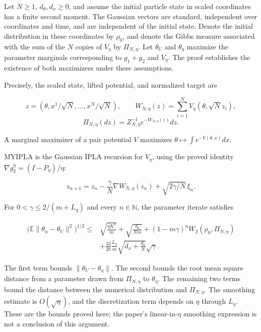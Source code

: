 \documentclass[11pt,a4paper]{report}
\begin{document}
Let \(N\ge1\), \(d_\theta,d_x\ge0\), and assume the initial particle state in scaled coordinates has a finite second moment. The Gaussian vectors are standard, independent over coordinates and time, and are independent of the initial state. Denote the initial distribution in these coordinates by \(\rho_0\), and denote the Gibbs measure associated with the sum of the \(N\) copies of \(V_\eta\) by \(\Pi_{N,\eta}\). Let \(\theta_U\) and \(\theta_\eta\) maximize the parameter marginals corresponding to \(g_1+g_2\) and \(V_\eta\). The proof establishes the existence of both maximizers under these assumptions.



Precisely, the scaled state, lifted potential, and normalized target are


\[z=(\theta,x^1/\sqrt N,\ldots,x^N/\sqrt N),\qquad
W_{N,\eta}(z)=\sum_{i=1}^N V_\eta(\theta,\sqrt N z_i),\]
\[\Pi_{N,\eta}(dz)=Z_{N,\eta}^{-1}e^{-W_{N,\eta}(z)}dz.\]


A marginal maximizer of a pair potential \(V\) maximizes \(\theta\mapsto\int e^{-V(\theta,x)}dx\).



MYIPLA is the Gaussian IPLA recursion for \(V_\eta\), using the proved identity \(\nabla g_2^\eta=(I-P_\eta)/\eta\):


\[z_{n+1}=z_n-\frac\gamma N\nabla W_{N,\eta}(z_n)+\sqrt{2\gamma/N}\,\xi_n.\]


For \(0<\gamma\le2/(m+L_\eta)\) and every \(n\in\mathbb N\), the parameter iterate satisfies


\[\begin{aligned}
\bigl(\mathbb E\|\theta_n-\theta_U\|^2\bigr)^{1/2}
\le{}&\sqrt{\frac{\eta K^2}{m}}+\sqrt{\frac{d_\theta}{Nm}}
+(1-m\gamma)^nW_2(\rho_0,\Pi_{N,\eta})\\
&+\frac{33}{20}\frac{L_\eta}{m}\sqrt{d_x+\frac{d_\theta}{N}}\sqrt\gamma.
\end{aligned}\]


The first term bounds \(\|\theta_U-\theta_\eta\|\). The second bounds the root mean square distance from a parameter drawn from \(\Pi_{N,\eta}\) to \(\theta_\eta\). The remaining two terms bound the distance between the numerical distribution and \(\Pi_{N,\eta}\). The smoothing estimate is \(O(\sqrt\eta)\), and the discretization term depends on \(\eta\) through \(L_\eta\). These are the bounds proved here; the paper's linear-in-\(\eta\) smoothing expression is not a conclusion of this argument.
\end{document}
